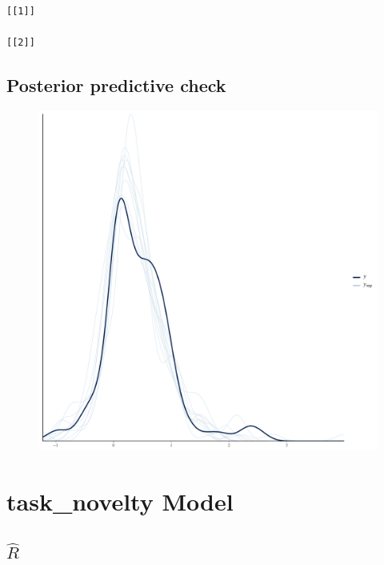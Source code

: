 \documentclass[
]{report}
\begin{document}
\begin{verbatim}
[[1]]

[[2]]
\end{verbatim}

\hypertarget{posterior-predictive-check-4}{%
\section{Posterior predictive
check}\label{posterior-predictive-check-4}}

\begin{figure}

{\centering \includegraphics[width=1\textwidth,height=\textheight]{diagnostic_plots_files/figure-pdf/unnamed-chunk-15-1.pdf}

}

\end{figure}

\hypertarget{task_novelty-model}{%
\chapter{task\_novelty Model}\label{task_novelty-model}}

\hypertarget{hatr-5}{%
\section{\texorpdfstring{\(\hat{R}\)}{\textbackslash hat\{R\}}}\label{hatr-5}}
\end{document}

